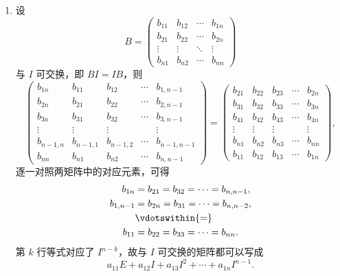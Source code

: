 \documentclass[UTF8,12pt,a4paper,fontset=fandol]{ctexart}
\begin{document}
\begin{solve}
\begin{enumerate}
                \item 设 
\[B = \begin{pmatrix}
                        b_{11} & b_{12} & \cdots & b_{1n} \\
                        b_{21} & b_{22} & \cdots & b_{2n} \\
                        \vdots & \vdots & \ddots & \vdots \\
                        b_{n1} & b_{n2} & \cdots & b_{nn}
                    \end{pmatrix}\]
 与 $I$ 可交换，即 $BI=IB$，则
                    \[
                        \begin{pmatrix}
                            b_{1n} & b_{11} & b_{12} & \cdots & b_{1,n-1} \\
                            b_{2n} & b_{21} & b_{22} & \cdots & b_{2,n-1} \\
                            b_{3n} & b_{31} & b_{32} & \cdots & b_{3,n-1} \\
                            \vdots & \vdots & \vdots &        & \vdots    \\
                            b_{n-1,n} & b_{n-1,1} & b_{n-1,2} & \cdots & b_{n-1,n-1} \\
                            b_{nn} & b_{n1} & b_{n2} & \cdots & b_{n,n-1}
                        \end{pmatrix} = \begin{pmatrix}
                            b_{21} & b_{22} & b_{23} & \cdots & b_{2n} \\
                            b_{31} & b_{32} & b_{33} & \cdots & b_{3n} \\
                            b_{41} & b_{42} & b_{43} & \cdots & b_{4n} \\
                            \vdots & \vdots & \vdots &        & \vdots \\
                            b_{n1} & b_{n2} & b_{n3} & \cdots & b_{nn} \\
                            b_{11} & b_{12} & b_{13} & \cdots & b_{1n}
                        \end{pmatrix},
                    \]
                    逐一对照两矩阵中的对应元素，可得
                    \begin{align*}
                        b_{1n} &= b_{21} = b_{32} = \cdots = b_{n,n-1}, \\
                        b_{1,n-1} &= b_{2n} = b_{31} = \cdots = b_{n,n-2}, \\
                        &\vdotswithin{=} \\
                        b_{11} &= b_{22} = b_{33} = \cdots = b_{nn}.
                    \end{align*}
                    第 $k$ 行等式对应了 $I^{n-k}$，故与 $I$ 可交换的矩阵都可以写成
                    \[
                        a_{11}E + a_{12}I + a_{13}I^2 + \cdots + a_{1n}I^{n-1}.
                    \]


\end{enumerate}
\end{solve}
\end{document}
